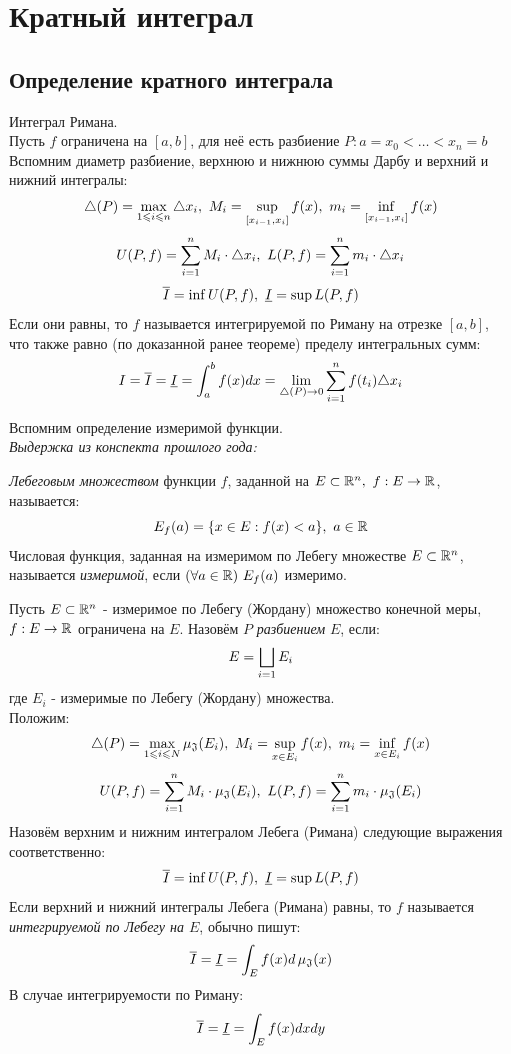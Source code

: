 \section{Кратный интеграл}
\subsection{Определение кратного интеграла}
\begin{reminder}
	Интеграл Римана. \\
	Пусть $f$ ограничена на $[a,b]$, для неё есть разбиение $P:a=x_0<\dots<x_n=b$\\
	Вспомним диаметр разбиение, верхнюю и нижнюю суммы Дарбу и верхний и нижний интегралы:
	\[\tr(P)=\max_{1\le i\le n}\tr x_i,\ M_i=\sup_{[x_{i-1},x_i]}f(x),\ m_i=\inf_{[x_{i-1},x_i]}f(x)\]
	\[U(P,f)=\ns M_i\cdot\tr x_i,\ L(P,f)=\ns m_i\cdot\tr x_i\]
	\[\v I=\inf U(P,f),\ \uv I=\sup L(P,f)\]
	Если они равны, то $f$ называется интегрируемой по Риману на отрезке $[a,b]$, что также равно (по доказанной ранее теореме) пределу интегральных сумм:
	\[I=\v I=\uv I=\int_a^bf(x)dx=\lim_{\tr(P)\ra0}\ns f(t_i)\tr x_i\]
\end{reminder}
\begin{reminder}
	Вспомним определение измеримой функции.\\
	\textit{Выдержка из конспекта прошлого года:}
	\begin{definition}
		\textit{Лебеговым множеством} функции $f$, заданной на $E\subset\mathbb{R}^n,\ f:E\rightarrow \mathbb{R}$, называется:
		\[E_f(a)=\{x\in E:f(x)<a\},\ a\in\R\]
		Числовая функция, заданная на измеримом по Лебегу множестве $E\subset\mathbb{R}^n$, называется \textit{измеримой}, если $(\fa a\in\R)\ E_f(a)$ измеримо.
	\end{definition}
\end{reminder}
\begin{definition}
	Пусть $E\subset\mathbb{R}^n$ - измеримое по Лебегу (Жордану) множество конечной меры, $f:E\rightarrow\mathbb{R}$ ограничена на $E$. Назовём $P$ \textit{разбиением} $E$, если: \[E=\bigsqcup_{i=1}E_i\]
	где $E_i$ - измеримые по Лебегу (Жордану) множества.\\
	Положим:
	\[\tr(P)=\max_{1\le i\le N}\jm(E_i),\ M_i=\sup_{x\in E_i}f(x),\ m_i=\inf_{x\in E_i}f(x)\]
	\[U(P,f)=\ns M_i\cdot\jm(E_i),\ L(P,f)=\ns m_i\cdot\jm(E_i)\]
	Назовём верхним и нижним интегралом Лебега (Римана) следующие выражения соответственно:
	\[\v I=\inf U(P,f),\ \uv I=\sup L(P,f)\]
	Если верхний и нижний интегралы Лебега (Римана) равны, то $f$ называется \textit{интегрируемой по Лебегу на $E$}, обычно пишут:
	\[\overline I=\underline I=\int_Ef(x)d\operatorname{\mu_\mathfrak{J}}(x)\]
	В случае интегрируемости по Риману:
	\[\overline I=\underline I=\int_Ef(x)dxdy\]
\end{definition} 
